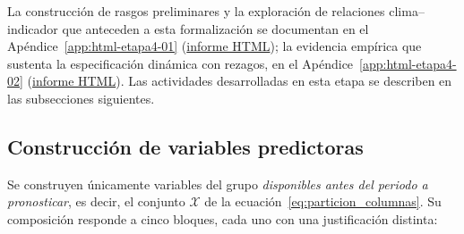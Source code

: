 La construcción de rasgos preliminares y la exploración de relaciones clima--indicador que anteceden a esta formalización se documentan en el Apéndice~\ref{app:html-etapa4-01} (\href{\urlEtapaCuatroUno}{informe HTML}); la evidencia empírica que sustenta la especificación dinámica con rezagos, en el Apéndice~\ref{app:html-etapa4-02} (\href{\urlEtapaCuatroDos}{informe HTML}). Las actividades desarrolladas en esta etapa se describen en las subsecciones siguientes.

\subsection{Construcción de variables predictoras}
\label{sec:construccion_predictoras}
Se construyen únicamente variables del grupo \textit{disponibles antes del periodo a pronosticar}, es decir, el conjunto $\mathcal{X}$ de la ecuación~\eqref{eq:particion_columnas}. Su composición responde a cinco bloques, cada uno con una justificación distinta:

